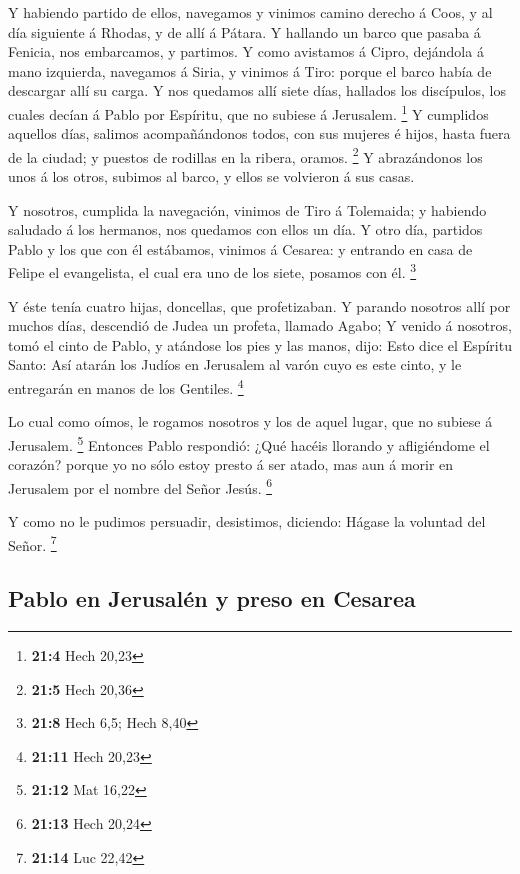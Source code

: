  Y habiendo partido de ellos, navegamos y vinimos camino
derecho á Coos, y al día siguiente á Rhodas, y de allí á Pátara.
 Y hallando un barco que pasaba á Fenicia, nos embarcamos, y
partimos.  Y como avistamos á Cipro, dejándola á mano
izquierda, navegamos á Siria, y vinimos á Tiro: porque el barco había de
descargar allí su carga.  Y nos quedamos allí siete días,
hallados los discípulos, los cuales decían á Pablo por Espíritu, que no
subiese á Jerusalem. \footnote{\textbf{21:4} Hech 20,23}  Y
cumplidos aquellos días, salimos acompañándonos todos, con sus mujeres é
hijos, hasta fuera de la ciudad; y puestos de rodillas en la ribera,
oramos. \footnote{\textbf{21:5} Hech 20,36}  Y abrazándonos
los unos á los otros, subimos al barco, y ellos se volvieron á sus
casas.

 Y nosotros, cumplida la navegación, vinimos de Tiro á
Tolemaida; y habiendo saludado á los hermanos, nos quedamos con ellos un
día.  Y otro día, partidos Pablo y los que con él estábamos,
vinimos á Cesarea: y entrando en casa de Felipe el evangelista, el cual
era uno de los siete, posamos con él. \footnote{\textbf{21:8} Hech 6,5;
  Hech 8,40}

 Y éste tenía cuatro hijas, doncellas, que profetizaban.
 Y parando nosotros allí por muchos días, descendió de
Judea un profeta, llamado Agabo;  Y venido á nosotros, tomó
el cinto de Pablo, y atándose los pies y las manos, dijo: Esto dice el
Espíritu Santo: Así atarán los Judíos en Jerusalem al varón cuyo es este
cinto, y le entregarán en manos de los Gentiles. \footnote{\textbf{21:11}
  Hech 20,23}

 Lo cual como oímos, le rogamos nosotros y los de aquel
lugar, que no subiese á Jerusalem. \footnote{\textbf{21:12} Mat 16,22}
 Entonces Pablo respondió: ¿Qué hacéis llorando y
afligiéndome el corazón? porque yo no sólo estoy presto á ser atado, mas
aun á morir en Jerusalem por el nombre del Señor Jesús. \footnote{\textbf{21:13}
  Hech 20,24}

 Y como no le pudimos persuadir, desistimos, diciendo:
Hágase la voluntad del Señor. \footnote{\textbf{21:14} Luc 22,42}

\hypertarget{pablo-en-jerusaluxe9n-y-preso-en-cesarea}{%
\subsection{Pablo en Jerusalén y preso en
Cesarea}\label{pablo-en-jerusaluxe9n-y-preso-en-cesarea}}

